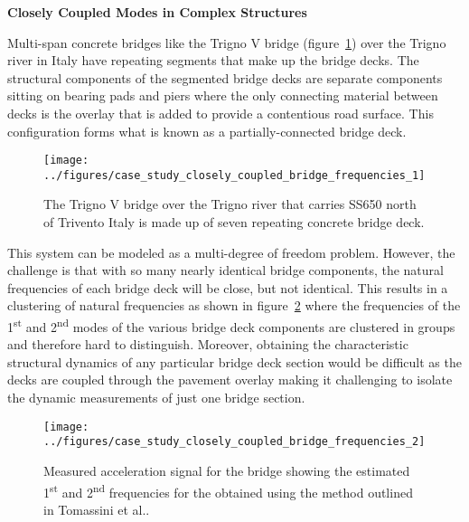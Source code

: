 \documentclass[12pt,letter]{article}
\begin{document}
	
	
	\begin{vibration_case_study}

	\textbf{Closely Coupled Modes in Complex Structures}

	\noindent Multi-span concrete bridges like the Trigno V bridge (figure~\ref{fig:case_study_closely_coupled_bridge_frequencies_1}) over the Trigno river in Italy have repeating segments that make up the bridge decks. The structural components of the segmented bridge decks are separate components sitting on bearing pads and piers where the only connecting material between decks is the overlay that is added to provide a contentious road surface. This configuration forms what is known as a partially-connected bridge deck\protect\footnotemark[1].
	\begin{figure}[H]
		\centering
		\texttt{[image: ../figures/case\_study\_closely\_coupled\_bridge\_frequencies\_1]}
		\caption{The Trigno V bridge over the Trigno river that carries SS650 north of Trivento Italy is made up of seven repeating concrete bridge deck\protect\footnotemark[2]. }%
		\label{fig:case_study_closely_coupled_bridge_frequencies_1}
	\end{figure}
	
	This system can be modeled as a multi-degree of freedom problem. However, the challenge is that with so many nearly identical bridge components, the natural frequencies of each bridge deck will be close, but not identical. This results in a clustering of natural frequencies as shown in figure~\ref{fig:case_study_closely_coupled_bridge_frequencies_2} where the frequencies of the 1\textsuperscript{st} and 2\textsuperscript{nd} modes of the various bridge deck components are clustered in groups and therefore hard to distinguish. Moreover, obtaining the characteristic structural dynamics of any particular bridge deck section would be difficult as the decks are coupled through the pavement overlay making it challenging to isolate the dynamic measurements of just one bridge section. 
	
	\begin{figure}[H]
		\centering
		\texttt{[image: ../figures/case\_study\_closely\_coupled\_bridge\_frequencies\_2]}
		\caption{Measured acceleration signal for the bridge showing the estimated 1\textsuperscript{st} and 2\textsuperscript{nd} frequencies for the obtained using the method outlined in Tomassini et al.\protect\footnotemark[1].}
		\label{fig:case_study_closely_coupled_bridge_frequencies_2}
	\end{figure}
	

\end{vibration_case_study}
\end{document}
